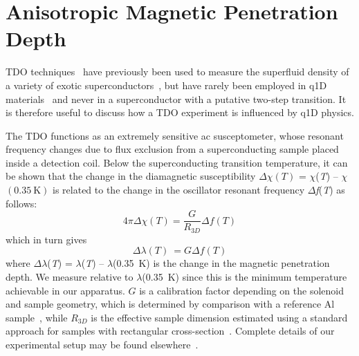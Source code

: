 \documentclass[prb,twocolumn,showpacs,preprintnumbers,amsmath,amssymb,floatfix,groupedaddress,superscriptaddress,aps,10pt]{revtex4-1}
\begin{document}
\section{Anisotropic Magnetic Penetration Depth}

TDO techniques~\cite{Prozorov2006} have previously been used to measure the superfluid density of a variety of exotic superconductors~\cite{Bonalde2000,Chia2003,Chia2005,Cho2012a}, but have rarely been employed in q1D materials~\cite{Pang2015} and never in a superconductor with a putative two-step transition.  It is therefore useful to discuss how a TDO experiment is influenced by q1D physics.  

The TDO functions as an extremely sensitive ac susceptometer, whose resonant frequency changes due to flux exclusion from a superconducting sample placed inside a detection coil.  Below the superconducting transition temperature, it can be shown that the change in the diamagnetic susceptibility $\Delta \chi(T)$ = $\chi$(\textit{T}) -- $\chi$ $(0.35~\text{K})$ is related to the change in the oscillator resonant frequency $\Delta $\textit{f}(\textit{T}) as follows:~\cite{Carrington1999}
\begin{equation} \label{ChiT}
4\pi\Delta\chi(T)=\frac{G}{R_{3D}}\Delta f(T)
\end{equation}           
which in turn gives
\begin{equation} \label{lambdaT}
\Delta \lambda (T) \ = \mathit{G}\Delta \mathit{f(T)}
\end{equation}          
where $\Delta$$\lambda$(\textit{T}) = $\lambda$(\textit{T}) -- $\lambda $(0.35~K) is the change in the magnetic penetration depth. We measure relative to $\lambda$(0.35~K) since this is the minimum temperature achievable in our apparatus.  $G$ is a calibration factor depending on the solenoid and sample geometry, which is determined by comparison with a reference Al sample~\cite{Chia2003a}, while $R_{3D}$ is the effective sample dimension estimated using a standard approach for samples with rectangular cross-section~\cite{Prozorov2000}.  Complete details of our experimental setup may be found elsewhere~\cite{Mitra2017}. 
\end{document}
